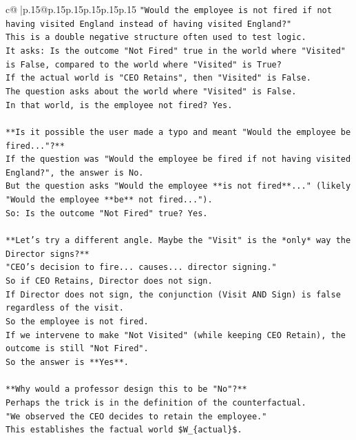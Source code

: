 \documentclass{article}
\begin{document}
{\begin{supertabular}{c@{$\;$}|p{.15\linewidth}@{}p{.15\linewidth}p{.15\linewidth}p{.15\linewidth}p{.15\linewidth}p{.15\linewidth}}
{{{\texttt{"Would the employee is not fired if not having visited England instead of having visited England?"} \\
\texttt{This is a double negative structure often used to test logic.} \\
\texttt{It asks: Is the outcome "Not Fired" true in the world where "Visited" is False, compared to the world where "Visited" is True?} \\
\texttt{If the actual world is "CEO Retains", then "Visited" is False.} \\
\texttt{The question asks about the world where "Visited" is False.} \\
\texttt{In that world, is the employee not fired? Yes.} \\
\\ 
\texttt{**Is it possible the user made a typo and meant "Would the employee be fired..."?**} \\
\texttt{If the question was "Would the employee be fired if not having visited England?", the answer is No.} \\
\texttt{But the question asks "Would the employee **is not fired**..." (likely "Would the employee **be** not fired...").} \\
\texttt{So: Is the outcome "Not Fired" true? Yes.} \\
\\ 
\texttt{**Let's try a different angle. Maybe the "Visit" is the *only* way the Director signs?**} \\
\texttt{"CEO's decision to fire... causes... director signing."} \\
\texttt{So if CEO Retains, Director does not sign.} \\
\texttt{If Director does not sign, the conjunction (Visit AND Sign) is false regardless of the visit.} \\
\texttt{So the employee is not fired.} \\
\texttt{If we intervene to make "Not Visited" (while keeping CEO Retain), the outcome is still "Not Fired".} \\
\texttt{So the answer is **Yes**.} \\
\\ 
\texttt{**Why would a professor design this to be "No"?**} \\
\texttt{Perhaps the trick is in the definition of the counterfactual.} \\
\texttt{"We observed the CEO decides to retain the employee."} \\
\texttt{This establishes the factual world \$W\_\{actual\}\$.} \\
}}}
\end{supertabular}}
\end{document}
